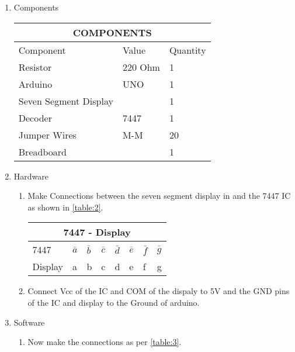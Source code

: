 \documentclass{article}
\begin{document}
\begin{enumerate}
	\item Components
		\newline {}\label{table:1}\begin{tabular}{|p{5cm}|p{3cm}|p{2cm}|}
			\hline
			\multicolumn{3}{|c|}{COMPONENTS}\\
			\hline
			Component& Value& Quantity\\
			\hline
			Resistor &220 Ohm& 1\\
			\hline
			Arduino& UNO& 1\\
			\hline
			Seven Segment Display&  & 1\\
			\hline
			Decoder& 7447& 1\\
			\hline
			Jumper Wires& M-M& 20\\
			\hline
			Breadboard&  & 1\\
			\hline
		\end{tabular}
	\newline\newline\item Hardware
		\begin{enumerate}
			\item Make Connections between the seven segment display in and the 7447 IC as shown in \ref{table:2}.
				\newline {}\label{table:2}\begin{tabular}{|p{3cm}|p{1cm}|p{1cm}|p{1cm}|p{1cm}|p{1cm}|p{1cm}|p{1cm}|}
					\hline
					\multicolumn{8}{|c|}{7447 - Display}\\
					\hline
					7447& $\bar{a}$ & $\bar{b}$ & $\bar{c}$ & $\bar{d}$ & $\bar{e}$ & $\bar{f}$ & $\bar{g}$ \\
					\hline
					Display& a& b& c& d& e& f& g\\
					\hline
				\end{tabular}
				\newline
			\item Connect Vcc of the IC and COM of the dispaly to 5V and the GND pins of the IC and display to the Ground of arduino.
		\end{enumerate}
	\item Software
		\begin{enumerate}
			\item Now make the connections as per \ref{table:3}.
				\newline{}\label{table:3}\begin{tabular}{|p{3cm}|p{1cm}|p{1cm}|p{1cm}|p{1cm}|}

\end{tabular}
\end{enumerate}
\end{enumerate}
\end{document}

